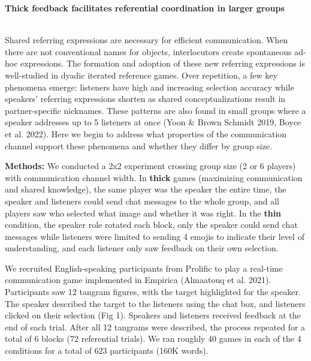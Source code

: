 \documentclass[11pt,a4paper]{article}
\renewcommand{\title}[1]{\textbf{#1}\\}
\newcommand{\authors}[1]{\iftoggle{anonymous}{\phantom{#1}}{#1}\\}
\newcommand{\email}[1]{\iftoggle{anonymous}{\phantom{#1}}{#1}}
\begin{document}


\title{Thick feedback facilitates referential coordination in larger groups}
\authors{Veronica Boyce\textsuperscript{1}, Robert D.  Hawkins\textsuperscript{2}, Noah D. Goodman\textsuperscript{1}, Michael C. Frank\textsuperscript{1}} 
\email{vboyce@stanford.edu;  \textsuperscript{1}Stanford, \textsuperscript{2}Princeton}
\newline
%

Shared referring expressions are necessary for efficient communication. When there are not conventional names for objects, interlocutors create spontaneous ad-hoc expressions. The formation and adoption of these new referring expressions is well-studied in dyadic iterated reference games. Over repetition, a few key phenomena emerge: listeners have high and increasing selection accuracy while speakers' referring expressions shorten as shared conceptualizations result in partner-specific nicknames. These patterns are also found in small groups where a speaker addresses up to 5 listeners at once (Yoon \& Brown Schmidt 2019, Boyce et al. 2022). Here we begin to address what properties of the communication channel support these phenomena and whether they differ by group size.

\textbf{Methods:} We conducted a 2x2 experiment crossing group size (2 or 6 players) with communication channel width. In \textbf{thick} games (maximizing communication and shared knowledge), the same player was the speaker the entire time, the speaker and listeners could send chat messages to the whole group, and all players saw who selected what image and whether it was right. In the \textbf{thin} condition, the speaker role rotated each block, only the speaker could send chat messages while listeners were limited to sending 4 emojis to indicate their level of understanding, and each listener only saw feedback on their own selection.

We recruited English-speaking participants from Prolific to play a real-time communication game implemented in Empirica (Almaatouq et al. 2021). Participants saw 12 tangram figures, with the target highlighted for the speaker. The speaker described the target to the listeners using the chat box, and listeners clicked on their selection (Fig 1). Speakers and listeners received feedback at the end of each trial. After all 12 tangrams were described, the process repeated for a total of 6 blocks (72 referential trials). We ran roughly 40 games in each of the 4 conditions for a total of 623 participants (160K words). 
\end{document}
